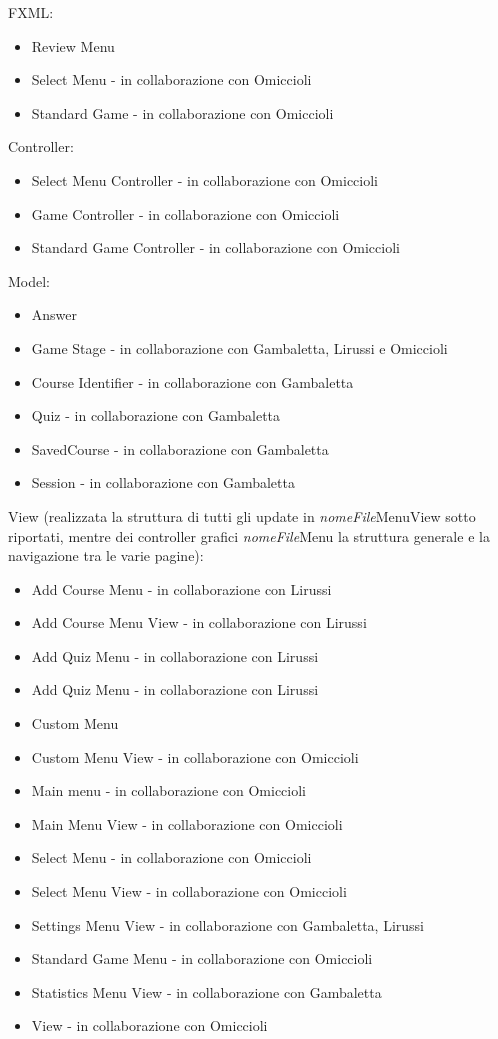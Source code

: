     FXML:
    \begin{itemize}
        \item Review Menu
        \item Select Menu - in collaborazione con Omiccioli
        \item Standard Game - in collaborazione con Omiccioli
    \end{itemize}
    Controller:
    \begin{itemize}
        \item Select Menu Controller - in collaborazione con Omiccioli
        \item Game Controller - in collaborazione con Omiccioli
        \item Standard Game Controller - in collaborazione con Omiccioli
    \end{itemize}
    Model:
    \begin{itemize}
        \item Answer
        \item Game Stage - in collaborazione con Gambaletta, Lirussi e Omiccioli
        \item Course Identifier - in collaborazione con Gambaletta
        \item Quiz - in collaborazione con Gambaletta
        \item SavedCourse - in collaborazione con Gambaletta
        \item Session - in collaborazione con Gambaletta
    \end{itemize}
    View (realizzata la struttura di tutti gli update in \textit{nomeFile}MenuView sotto riportati, mentre dei controller grafici \textit{nomeFile}Menu la struttura generale e la navigazione tra le varie pagine):
    \begin{itemize}
        \item Add Course Menu - in collaborazione con Lirussi
        \item Add Course Menu View - in collaborazione con Lirussi
        \item Add Quiz Menu - in collaborazione con Lirussi
        \item Add Quiz Menu - in collaborazione con Lirussi
        \item Custom Menu
        \item Custom Menu View - in collaborazione con Omiccioli
        \item Main menu - in collaborazione con Omiccioli
        \item Main Menu View - in collaborazione con Omiccioli
        \item Select Menu - in collaborazione con Omiccioli
        \item Select Menu View - in collaborazione con Omiccioli
        \item Settings Menu View - in collaborazione con Gambaletta, Lirussi
        \item Standard Game Menu - in collaborazione con Omiccioli
        \item Statistics Menu View - in collaborazione con Gambaletta
        \item View - in collaborazione con Omiccioli
    \end{itemize}

    